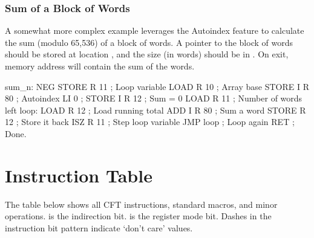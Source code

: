 \subsubsection{Sum of a Block of Words}

A somewhat more complex example leverages the Autoindex feature to
calculate the sum (modulo 65,536) of a block of words. A pointer to
the block of words should be stored at location , and the
size (in words) should be in \A. On exit, memory address 
will contain the sum of the words.

\begin{cftasmcode}
sum_n:  NEG
        STORE R 11   ; Loop variable
        LOAD R 10    ; Array base
        STORE I R 80 ; Autoindex
        LI 0         ; 
        STORE I R 12 ; Sum = 0
        LOAD R 11    ; Number of words left
loop:   LOAD R 12    ; Load running total
        ADD I R 80   ; Sum a word
        STORE R 12   ; Store it back
        ISZ R 11     ; Step loop variable
        JMP loop     ; Loop again
        RET          ; Done.
\end{cftasmcode}





\section{Instruction Table}

The table below shows all CFT instructions, standard macros, and minor
operations.  is the indirection bit.  is the register mode
bit. Dashes in the instruction bit pattern indicate ‘don't care’ values.

